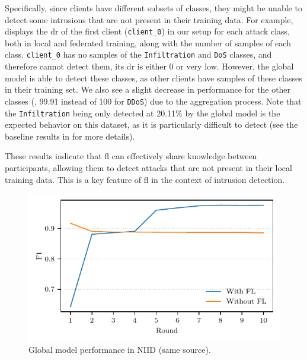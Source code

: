 Specifically, since clients have different subsets of classes, they might be unable to detect some intrusions that are not present in their training data.
For example,  displays the \gls{dr} of the first client (\texttt{client\_0}) in our setup for each attack class, both in local and federated training, along with the number of samples of each class.
\texttt{client\_0} has no samples of the \texttt{Infiltration} and \texttt{DoS} classes, and therefore cannot detect them, \ie its \gls{dr} is either 0 or very low.
However, the global model is able to detect these classes, as other clients have samples of these classes in their training set.
We also see a slight decrease in performance for the other classes (\eg, 99.91 instead of 100 for \texttt{DDoS}) due to the aggregation process.
Note that the \texttt{Infiltration} being only detected at 20.11\% by the global model is the expected behavior on this dataset, as it is particularly difficult to detect (see the baseline results in  for more details).

These results indicate that \gls{fl} can effectively share knowledge between participants, allowing them to detect attacks that are not present in their local training data.
This is a key feature of \gls{fl} in the context of intrusion detection.

\begin{figure}
    \centering
    \includegraphics{figures/niid.pdf}
    \caption{Global model performance in NIID (same source).}
    \label{fig:niid}
\end{figure}

